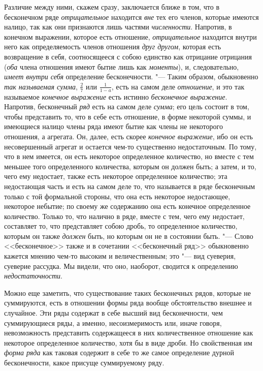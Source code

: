 Различие между ними, скажем сразу, заключается ближе в том, что в
бесконечном ряде {\em отрицательное} находится
{\em вне} тех его членов, которые имеются налицо, так
как они признаются лишь частями {\em численности}.
Напротив, в конечном выражении, которое есть отношение,
{\em отрицательное} находится внутри него как
определяемость членов отношения {\em друг другом},
которая есть возвращение в себя, соотносящееся с собою единство как
отрицание отрицания ({\em оба} члена отношения имеют
бытие лишь как {\em моменты}), и, следовательно,
{\em имеет внутри себя} определение бесконечности. "---
Таким образом, обыкновенно {\em так называемая сумма},
$\frac 2 7$ или $\frac 1{1-a}$, есть на самом деле
{\em отношение}, и это так называемое {\em конечное выражение} есть истинно
{\em бесконечное выражение}. Напротив, бесконечный {\em ряд} есть на самом
деле {\em сумма}; его цель состоит в том, чтобы представить
то, что в себе есть отношение, в форме некоторой суммы, и имеющиеся налицо
члены ряда имеют бытие как члены не некоторого отношения, а агрегата. Он,
далее, есть скорее {\em конечное выражение}, ибо он
есть несовершенный агрегат и остается чем-то существенно недостаточным. По
тому, что в нем имеется, он есть некоторое определенное количество, но
вместе с тем меньшее того определенного количества, которым он должен быть;
а затем, и то, чего ему недостает, также есть некоторое определенное
количество; эта недостающая часть и есть на самом деле то, что называется в
ряде бесконечным только с той формальной стороны, что она есть некоторое
недостающее, некоторое небытие; по своему же содержанию она есть конечное
определенное количество. Только то, что налично в ряде, вместе с тем, чего
ему недостает, составляет то, что представляет собою дробь, то определенное
количество, которым он также {\em должен} быть, но
которым он не в состоянии быть. "--- Слово <<бесконечное>> также и в сочетании
<<бесконечный ряд>> обыкновенно кажется мнению чем-то высоким и
величественным; это "--- вид суеверия, суеверие рассудка. Мы видели, что оно,
наоборот, сводится к определению {\em недостаточности}.

Можно еще заметить, что существование таких бесконечных рядов, которые не
суммируются, есть в отношении формы ряда вообще обстоятельство внешнее и
случайное. Эти ряды содержат в себе высший вид бесконечности, чем
суммирующиеся ряды, а именно, несоизмеримость или, иначе говоря,
невозможность представить содержащееся в них количественное отношение как
некоторое определенное количество, хотя бы в виде дроби. Но свойственная им
{\em форма ряда} как таковая содержит в себе то же
самое определение дурной бесконечности, какое присуще суммируемому ряду.

